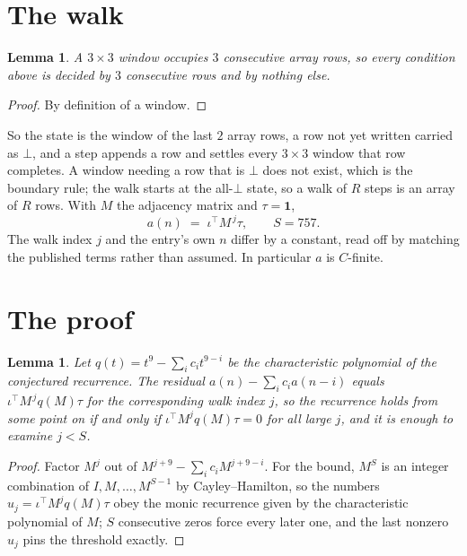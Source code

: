 \documentclass[11pt,a4paper]{article}
\theoremstyle{plain}
\newtheorem{lemma}[theorem]{Lemma}
\theoremstyle{definition}
\begin{document}
\section{The walk}

\begin{lemma}\label{lem:win}
A $3\times3$ window occupies $3$ consecutive array rows, so every condition above is
decided by $3$ consecutive rows and by nothing else.
\end{lemma}

\begin{proof}
By definition of a window.
\end{proof}

So the state is the window of the last $2$ array rows, a row not yet written carried as
$\bot$, and a step appends a row and settles every $3\times3$ window that row completes. A
window needing a row that is $\bot$ does not exist, which is the boundary rule; the walk starts
at the all-$\bot$ state, so a walk of $R$ steps is an array of $R$ rows. With $M$ the adjacency
matrix and $\tau=\mathbf{1}$,
\[
a(n)\;=\;\iota^{\!\top}M^{\,j}\tau ,\qquad S=757.
\]
The walk index $j$ and the entry's own $n$ differ by a constant, read off by matching the
published terms rather than assumed. In particular $a$ is $C$-finite.

\section{The proof}

\begin{lemma}\label{lem:crit}
Let $q(t)=t^{9}-\sum_i c_it^{9-i}$ be the characteristic polynomial of the
conjectured recurrence. The residual $a(n)-\sum_ic_ia(n-i)$ equals
$\iota^{\!\top}M^{\,j}q(M)\tau$ for the corresponding walk index $j$, so the recurrence
holds from some point on if and only if $\iota^{\!\top}M^{j}q(M)\tau=0$ for all large $j$,
and it is enough to examine $j<S$.
\end{lemma}

\begin{proof}
Factor $M^{j}$ out of $M^{j+9}-\sum_ic_iM^{j+9-i}$. For the bound, $M^{S}$
is an integer combination of $I,M,\dots,M^{S-1}$ by Cayley--Hamilton, so the numbers
$u_j=\iota^{\!\top}M^{j}q(M)\tau$ obey the monic recurrence given by the characteristic
polynomial of $M$; $S$ consecutive zeros force every later one, and the last nonzero $u_j$
pins the threshold exactly.
\end{proof}
\end{document}
